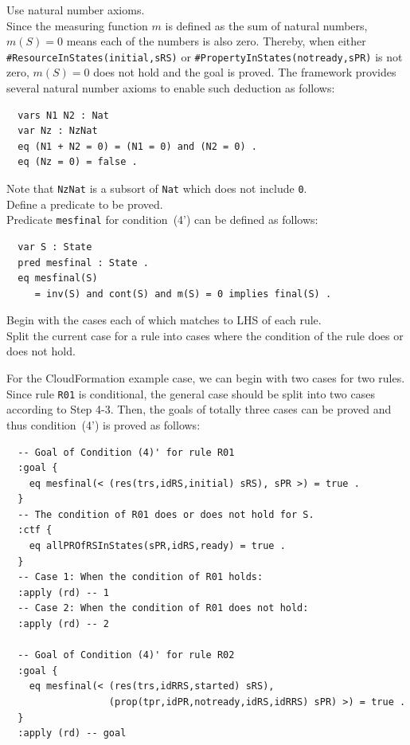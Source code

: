 \documentclass[12pt]{report}
\newcommand{\stt}[1]{{\small{\tt {#1}}}}
\begin{document}
 Use natural number axioms. \\
Since the measuring function $m$ is defined as the sum of natural
numbers, $m(S) = 0$ means each of the numbers is also zero. Thereby,
when either \stt{\#ResourceInStates(initial,sRS)} or
\stt{\#PropertyInStates(notready,sPR)} is not zero, $m(S) = 0$ does
not hold and the goal is proved. The framework provides
several natural number axioms to enable such deduction as follows:
\small
\begin{verbatim}
  vars N1 N2 : Nat
  var Nz : NzNat
  eq (N1 + N2 = 0) = (N1 = 0) and (N2 = 0) .
  eq (Nz = 0) = false .
\end{verbatim}
\normalsize
Note that {\tt NzNat} is a subsort of {\tt Nat} which does not
include {\tt 0}.\\

 Define a predicate to be proved. \\ Predicate
         {\tt mesfinal} for condition~(4') can be defined as follows:
\small
\begin{verbatim}
  var S : State
  pred mesfinal : State .
  eq mesfinal(S)
     = inv(S) and cont(S) and m(S) = 0 implies final(S) .
\end{verbatim}
\normalsize

 Begin with the cases each of which matches to
LHS of each rule. \\ 
 Split the current case for a rule into
cases where the condition of the rule does or does not hold. 

For the CloudFormation example case, we can begin with two cases for
two rules. Since rule {\tt R01} is conditional, the general case
should be split into two cases according to Step 4-3. Then, the goals
of totally three cases can be proved and thus condition~(4') is proved
as follows:
\small
\begin{verbatim}
  -- Goal of Condition (4)' for rule R01
  :goal {
    eq mesfinal(< (res(trs,idRS,initial) sRS), sPR >) = true .
  }
  -- The condition of R01 does or does not hold for S.
  :ctf {
    eq allPROfRSInStates(sPR,idRS,ready) = true .
  }
  -- Case 1: When the condition of R01 holds:
  :apply (rd) -- 1
  -- Case 2: When the condition of R01 does not hold:
  :apply (rd) -- 2

  -- Goal of Condition (4)' for rule R02
  :goal {
    eq mesfinal(< (res(trs,idRRS,started) sRS),
                  (prop(tpr,idPR,notready,idRS,idRRS) sPR) >) = true .
  }
  :apply (rd) -- goal
\end{verbatim}
\normalsize
\end{document}
